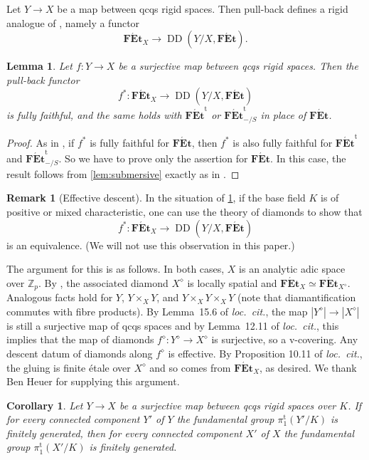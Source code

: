 \documentclass[a4paper,twoside,11pt,reqno]{amsart}
\renewcommand{\mathbb}{\mathds}
\newcommand{\bZ}{{\mathbb Z}}
\newcommand{\la}{\longrightarrow}
\newcommand{\cat}[1]{\mathbf{#1}}
\newcommand{\FEt}{\cat{F\acute{E}t}}
\newcommand{\pitame}{\pi_1^{\mathrm{t}}}
\newcommand{\FEtt}{{\cat{F\acute{E}t}}^{\!\mathrm{t}}}
\DeclareMathOperator{\Desc}{DD}
\newtheorem{lem}[thm]{Lemma}
\newtheorem{cor}[thm]{Corollary}
\theoremstyle{definition}
\newtheorem{rmk}[thm]{Remark}
\numberwithin{equation}{subsection}
\begin{document}
Let $Y\to X$ be a map between qcqs rigid spaces. Then pull-back defines a rigid analogue of , namely a functor 
\[
    \FEt_X\la \Desc(Y/X, \FEt).
\]

\begin{lem} 
\label{lem:univ-top-subm-descent}
    Let $f\colon Y\to X$ be a surjective map between qcqs rigid spaces. Then the pull-back functor
    \[ 
       f^\ast \colon  \FEt_X\la \Desc(Y/X, \FEt)
    \]
    is fully faithful, and the same holds with $\FEtt$ or $\FEtt_{-/S}$ in place of $\FEt$.
\end{lem}

\begin{proof} 
As in , if $f^\ast$ is fully faithful for $\FEt$, then $f^\ast$ is also fully faithful for $\FEtt$ and $\FEtt_{-/S}$.
So we have to prove only the assertion for $\FEt$. In this case, the result follows from \cref{lem:submersive} exactly as in \cite[Exp.\ IX, Corollaire 3.3]{SGA1}.
\end{proof}

\begin{rmk}[Effective descent]
In the situation of \cref{lem:univ-top-subm-descent}, if the base field $K$ is of positive or mixed characteristic, one can use the theory of diamonds \cite{ScholzeECoD} to show that    
    \[ 
       f^\ast \colon  \FEt_X\la \Desc(Y/X, \FEt)
    \]
is an equivalence. (We will not use this observation in this paper.)

The argument for this is as follows. In both cases, $X$ is an analytic adic space over $\bZ_p$. By \cite[Lemma 15.6]{ScholzeECoD}, the associated diamond $X^{\diamond}$ is locally spatial and $\FEt_X \simeq \FEt_{X^\diamond}$. Analogous facts hold for $Y$, $Y\times_X Y$, and $Y\times_X Y \times_X Y$ (note that diamantification commutes with fibre products). By Lemma~15.6 of \emph{loc.~cit.}, the map $|Y^\diamond| \to |X^\diamond|$ is still a surjective map of qcqs spaces and by Lemma~12.11 of \emph{loc.~cit.}, this implies that the map of diamonds $f^\diamond \colon Y^\diamond \to X^\diamond$ is surjective, so a v-covering. Any descent datum of diamonds along $f^\diamond$ is effective. By Proposition 10.11 of \emph{loc.~cit.}, the gluing is finite \'etale over $X^\diamond$ and so comes from $\FEt_X$, as desired. We thank Ben Heuer for supplying this argument. 
\end{rmk}

\begin{cor} \label{cor:descent-of-fg-fett}
    Let $Y\to X$ be a surjective map between qcqs rigid spaces over $K$. 
    If for every connected component $Y'$ of $Y$ the fundamental group $\pitame(Y'/K)$ is finitely generated, then for every connected component $X'$ of $X$ the fundamental group $\pitame(X'/K)$ is finitely generated.
\end{cor}
\end{document}
